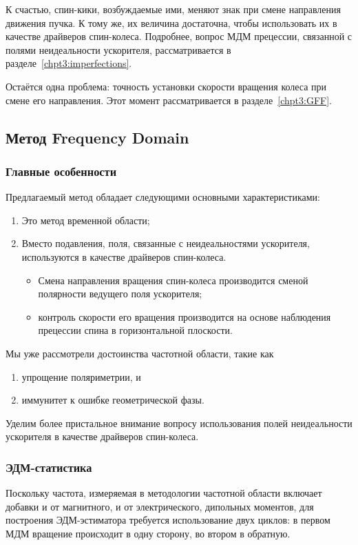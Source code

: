 К счастью, спин-кики, возбуждаемые ими, меняют знак при смене направления движения пучка. К тому же,
их величина достаточна, чтобы использовать их в качестве драйверов спин-колеса. 
Подробнее, вопрос МДМ прецессии, связанной с полями неидеальности ускорителя, рассматривается в
 разделе~\ref{chpt3:imperfections}.

Остаётся одна проблема: точность установки скорости вращения колеса при смене его направления. Этот момент
рассматривается в разделе~\ref{chpt3:GFF}.

\subsection{Метод Frequency Domain}\label{sec:FDM_concept}
\subsubsection{Главные особенности}
Предлагаемый метод обладает следующими основными характеристиками:
\begin{enumerate}
	\item Это метод временной области;
	\item Вместо подавления, поля, связанные с неидеальностями ускорителя, используются в качестве драйверов спин-колеса.
	\begin{itemize}
		\item Смена направления вращения спин-колеса производится сменой полярности ведущего поля ускорителя;
		\item контроль скорости его вращения производится на основе наблюдения прецессии спина в горизонтальной плоскости.
	\end{itemize}
\end{enumerate}

Мы уже рассмотрели достоинства частотной области, такие как 
\begin{enumerate}
	\item упрощение поляриметрии, и 
	\item иммунитет к ошибке геометрической фазы.
\end{enumerate}
Уделим более пристальное внимание вопросу использования полей неидеальности ускорителя в качестве драйверов спин-колеса.

\subsubsection{ЭДМ-статистика}
Поскольку частота, измеряемая в методологии частотной области включает добавки и от
магнитного, и от электрического, дипольных моментов, для построения ЭДМ-эстиматора требуется использование двух циклов:
в первом МДМ вращение происходит в одну сторону, во втором в обратную.

